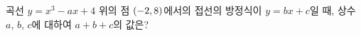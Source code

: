 곡선 $y=x^3-ax+4$ 위의 점 $(-2{,}\mkern3mu\mathopen{}8)$에서의 접선의 방정식이 $y=bx+c$일 때, 상수 $a$, $b$, $c$에 대하여 $a+b+c$의 값은?
